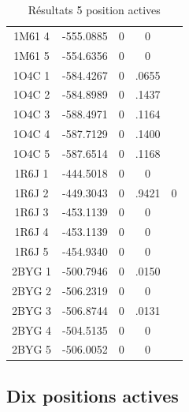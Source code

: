 \documentclass[a4paper,12pt]{article}
\begin{document}
\begin{table}[h]
\begin{tabular}{|c|c|c|c|c|}
        1M61 4 & -555.0885 & 0 & 0 &  \\
        1M61 5 & -554.6356 & 0 & 0 &  \\
        1O4C 1 & -584.4267 & 0 & .0655 &  \\
        1O4C 2 & -584.8989 & 0 & .1437 &  \\
        1O4C 3 & -588.4971 & 0 & .1164 &  \\
        1O4C 4 & -587.7129 & 0 & .1400 &  \\
        1O4C 5 & -587.6514 & 0 & .1168 &  \\
        1R6J 1 & -444.5018 & 0 & 0 &  \\
        1R6J 2 & -449.3043 & 0 & .9421 & 0 \\
        1R6J 3 & -453.1139 & 0 & 0 &  \\
        1R6J 4 & -453.1139 & 0 & 0 &  \\
        1R6J 5 & -454.9340 & 0 & 0 &  \\
        2BYG 1 & -500.7946 & 0 & .0150 &  \\
        2BYG 2 & -506.2319 & 0 & 0 &  \\
        2BYG 3 & -506.8744 & 0 & .0131 &  \\
        2BYG 4 & -504.5135 & 0 & 0 &  \\
        2BYG 5 & -506.0052 & 0 & 0 &  \\

        \hline




 \end{tabular}      
 \caption{Résultats 5 position actives}
 \label{tab_echec2BYG__1}      
\end{table}


   \subsection{ Dix positions actives}
\end{document}
